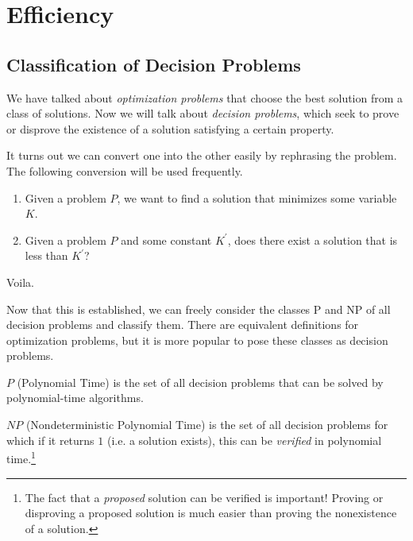 \section{Efficiency} 
  
\subsection{Classification of Decision Problems}

  We have talked about \textit{optimization problems} that choose the best solution from a class of solutions. Now we will talk about \textit{decision problems}, which seek to prove or disprove the existence of a solution satisfying a certain property. 

  \begin{lemma}
    It turns out we can convert one into the other easily by rephrasing the problem. The following conversion will be used frequently.  
    \begin{enumerate}
      \item Given a problem $P$, we want to find a solution that minimizes some variable $K$. 
      \item Given a problem $P$ and some constant $K^\prime$, does there exist a solution that is less than $K^\prime$? 
    \end{enumerate}
    Voila.  
  \end{lemma}

  Now that this is established, we can freely consider the classes P and NP of all decision problems and classify them. There are equivalent definitions for optimization problems, but it is more popular to pose these classes as decision problems. 

  \begin{definition}[P]
    $P$ (Polynomial Time) is the set of all decision problems that can be solved by polynomial-time algorithms. 
  \end{definition} 

  \begin{definition}[NP]
    $NP$ (Nondeterministic Polynomial Time) is the set of all decision problems for which if it returns $1$ (i.e. a solution exists), this can be \textit{verified} in polynomial time.\footnote{The fact that a \textit{proposed} solution can be verified is important! Proving or disproving a proposed solution is much easier than proving the nonexistence of a solution.}
  \end{definition}


